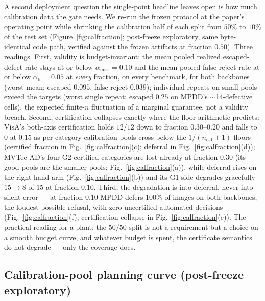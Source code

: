 \documentclass[preprint,11pt]{elsarticle}
\begin{document}
A second deployment question the single-point headline leaves open is how much
calibration data the gate needs. We re-run the frozen protocol at the paper's operating
point while shrinking the calibration half of each split from $50\%$ to $10\%$ of the
test set (Figure~\ref{fig:calfraction}; post-freeze exploratory, same byte-identical
code path, verified against the frozen artifacts at fraction $0.50$). Three readings.
First, validity is budget-invariant: the mean pooled realized escaped-defect rate stays
at or below $\alpha_{\text{miss}}=0.10$ and the mean pooled false-reject rate at or below
$\alpha_{\text{fr}}=0.05$ at \emph{every} fraction, on every benchmark, for both
backbones (worst mean: escaped $0.095$, false-reject $0.039$); individual repeats on
small pools exceed the targets (worst single repeat: escaped $0.25$ on MPDD's
$\sim$14-defective cells), the expected finite-$n$ fluctuation of a marginal guarantee,
not a validity breach. Second, certification collapses exactly where the floor arithmetic
predicts: VisA's both-axis certification holds $12/12$ down to fraction $0.30$--$0.20$
and falls to $0$ at $0.15$ as per-category calibration pools cross below the
$1/(n_{\text{cal}}+1)$ floors (certified fraction in Fig.~\ref{fig:calfraction}(c); deferral in
Fig.~\ref{fig:calfraction}(d)); MVTec AD's four G2-certified categories are lost already
at fraction $0.30$ (its good pools are the smaller pools; Fig.~\ref{fig:calfraction}(a)), while deferral
rises on the right-hand arm (Fig.~\ref{fig:calfraction}(b)) and its G1 side degrades
gracefully $15\to8$ of $15$ at fraction $0.10$. Third, the degradation is into deferral,
never into silent error --- at fraction $0.10$ MPDD defers $100\%$ of images on both
backbones, the loudest possible refusal, with zero uncertified automated decisions
(Fig.~\ref{fig:calfraction}(f); certification collapse in Fig.~\ref{fig:calfraction}(e)). The
practical reading for a plant: the $50/50$ split is not a requirement but a choice on a
smooth budget curve, and whatever budget is spent, the certificate semantics do not
degrade --- only the coverage does.

\subsection{Calibration-pool planning curve (post-freeze exploratory)}
\label{sec:calplanning}
\end{document}
